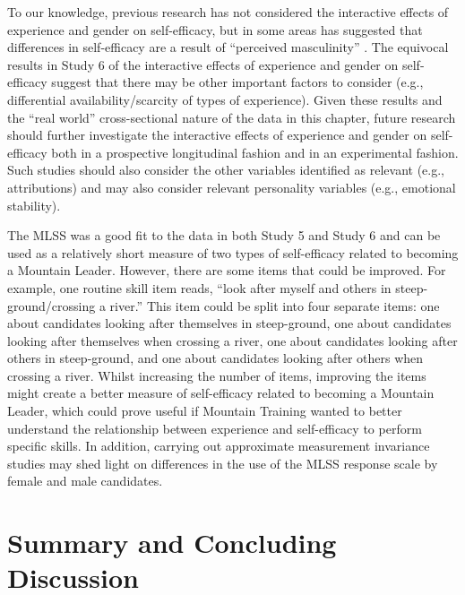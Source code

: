 \documentclass[
  12pt,
  a4paper,
]{book}
\begin{document}
To our knowledge, previous research has not considered the interactive effects of experience and gender on self-efficacy, but in some areas has suggested that differences in self-efficacy are a result of ``perceived masculinity'' \citep[p 135]{Cassidy2002}. The equivocal results in Study 6 of the interactive effects of experience and gender on self-efficacy suggest that there may be other important factors to consider (e.g., differential availability/scarcity of types of experience). Given these results and the ``real world'' cross-sectional nature of the data in this chapter, future research should further investigate the interactive effects of experience and gender on self-efficacy both in a prospective longitudinal fashion and in an experimental fashion. Such studies should also consider the other variables identified as relevant (e.g., attributions) and may also consider relevant personality variables (e.g., emotional stability).

The MLSS was a good fit to the data in both Study 5 and Study 6 and can be used as a relatively short measure of two types of self-efficacy related to becoming a Mountain Leader. However, there are some items that could be improved. For example, one routine skill item reads, ``look after myself and others in steep-ground/crossing a river.'' This item could be split into four separate items: one about candidates looking after themselves in steep-ground, one about candidates looking after themselves when crossing a river, one about candidates looking after others in steep-ground, and one about candidates looking after others when crossing a river. Whilst increasing the number of items, improving the items might create a better measure of self-efficacy related to becoming a Mountain Leader, which could prove useful if Mountain Training wanted to better understand the relationship between experience and self-efficacy to perform specific skills. In addition, carrying out approximate measurement invariance studies may shed light on differences in the use of the MLSS response scale by female and male candidates.

\hypertarget{chapter-4-general-discussion}{%
\section{Summary and Concluding Discussion}\label{chapter-4-general-discussion}}
\end{document}
